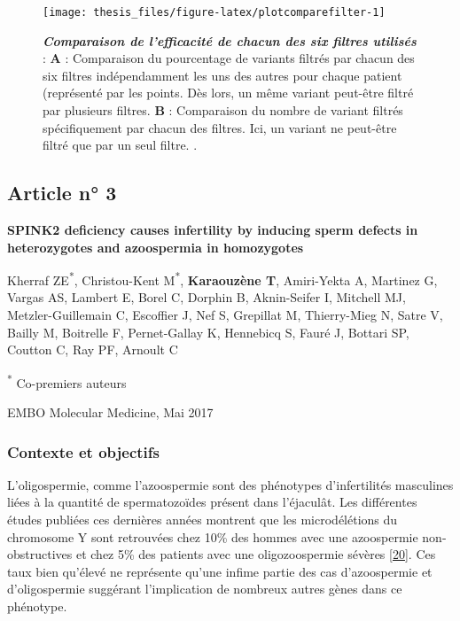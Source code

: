 \documentclass[12pt,twoside]{ugathesis}
\begin{document}
\newpage

\begin{figure}

{\centering \texttt{[image: thesis\_files/figure-latex/plotcomparefilter-1]} 

}

\caption[Comparaison de l'efficacité de chacun des six filtres utilisés]{\textbf{\emph{Comparaison de l'efficacité de
chacun des six filtres utilisés}} : \textbf{A} : Comparaison du
pourcentage de variants filtrés par chacun des six filtres
indépendamment les uns des autres pour chaque patient (représenté par
les points. Dès lors, un même variant peut-être filtré par plusieurs
filtres. \textbf{B} : Comparaison du nombre de variant filtrés
spécifiquement par chacun des filtres. Ici, un variant ne peut-être
filtré que par un seul filtre. .}\label{fig:plotcomparefilter}
\end{figure}










\newpage

\newpage  

\subsection{Article n° 3}\label{article-n-3}

\textbf{SPINK2 deficiency causes infertility by inducing sperm defects
in heterozygotes and azoospermia in homozygotes}

Kherraf ZE\textsuperscript{*}, Christou-Kent M\textsuperscript{*},
\textbf{Karaouzène T}, Amiri-Yekta A, Martinez G, Vargas AS, Lambert E,
Borel C, Dorphin B, Aknin-Seifer I, Mitchell MJ, Metzler-Guillemain C,
Escoffier J, Nef S, Grepillat M, Thierry-Mieg N, Satre V, Bailly M,
Boitrelle F, Pernet-Gallay K, Hennebicq S, Fauré J, Bottari SP, Coutton
C, Ray PF, Arnoult C

\textsuperscript{*} Co-premiers auteurs

EMBO Molecular Medicine, Mai 2017

\newpage

\subsubsection{Contexte et objectifs}\label{contexte-et-objectifs}

L'oligospermie, comme l'azoospermie sont des phénotypes d'infertilités
masculines liées à la quantité de spermatozoïdes présent dans
l'éjaculât. Les différentes études publiées ces dernières années
montrent que les microdélétions du chromosome Y sont retrouvées chez
10\% des hommes avec une azoospermie non-obstructives et chez 5\% des
patients avec une oligozoospermie sévères
{[}\protect\hyperlink{ref-Hotaling2014}{20}{]}. Ces taux bien qu'élevé
ne représente qu'une infime partie des cas d'azoospermie et
d'oligospermie suggérant l'implication de nombreux autres gènes dans ce
phénotype.
\end{document}
